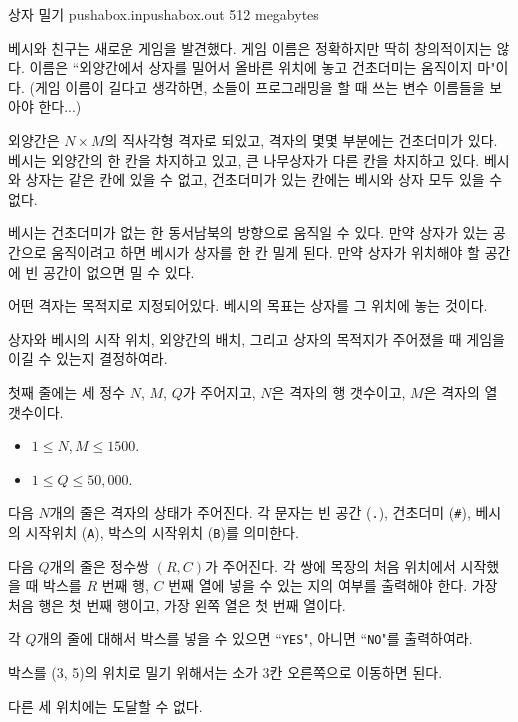 \begin{problem}{상자 밀기}
	{pushabox.in}{pushabox.out}
	{}{512 megabytes}{}
	
	베시와 친구는 새로운 게임을 발견했다. 게임 이름은 정확하지만 딱히 창의적이지는 않다. 이름은 ``외양간에서 상자를 밀어서 올바른 위치에 놓고 건초더미는 움직이지 마"이다. (게임 이름이 길다고 생각하면, 소들이 프로그래밍을 할 때 쓰는 변수 이름들을 보아야 한다...)
	
	외양간은 $N \times M$의 직사각형 격자로 되있고, 격자의 몇몇 부분에는 건초더미가 있다. 베시는 외양간의 한 칸을 차지하고 있고, 큰 나무상자가 다른 칸을 차지하고 있다. 베시와 상자는 같은 칸에 있을 수 없고, 건초더미가 있는 칸에는 베시와 상자 모두 있을 수 없다.
	
	베시는 건초더미가 없는 한 동서남북의 방향으로 움직일 수 있다. 만약 상자가 있는 공간으로 움직이려고 하면 베시가 상자를 한 칸 밀게 된다. 만약 상자가 위치해야 할 공간에 빈 공간이 없으면 밀 수 있다.
	
	어떤 격자는 목적지로 지정되어있다. 베시의 목표는 상자를 그 위치에 놓는 것이다.
	
	상자와 베시의 시작 위치, 외양간의 배치, 그리고 상자의 목적지가 주어졌을 때 게임을 이길 수 있는지 결정하여라.
	
	
	\InputFile
	
	첫째 줄에는 세 정수 $N$, $M$, $Q$가 주어지고, $N$은 격자의 행 갯수이고, $M$은 격자의 열 갯수이다.
	
	\begin{itemize}
		\item $1 \le N, M \le 1500$.
		\item $1 \le Q \le 50,000$.
	\end{itemize}
	
	다음 $N$개의 줄은 격자의 상태가 주어진다. 각 문자는 빈 공간 (\texttt{.}), 건초더미 (\texttt{\#}), 베시의 시작위치 (\texttt{A}), 박스의 시작위치 (\texttt{B})를 의미한다.
	
	다음 $Q$개의 줄은 정수쌍 $(R, C)$가 주어진다. 각 쌍에 목장의 처음 위치에서 시작했을 때 박스를 $R$ 번째 행, $C$ 번째 열에 넣을 수 있는 지의 여부를 출력해야 한다. 가장 처음 행은 첫 번째 행이고, 가장 왼쪽 열은 첫 번째 열이다.
	
	\OutputFile
	
	각 $Q$개의 줄에 대해서 박스를 넣을 수 있으면 ``\texttt{YES}", 아니면 ``\texttt{NO}"를 출력하여라.
	
	\Constraints
		
	\begin{example}
	\end{example}
	
	\Notes
	
	박스를 (3, 5)의 위치로 밀기 위해서는 소가 3칸 오른쪽으로 이동하면 된다.
	
	다른 세 위치에는 도달할 수 없다.
	
	
	
\end{problem}

